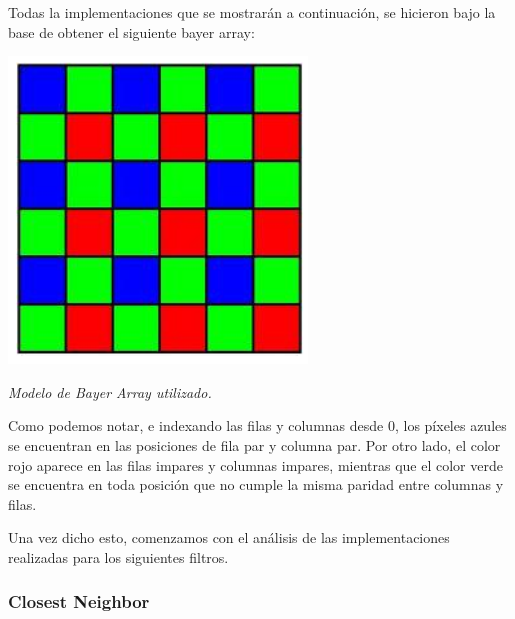 Todas la implementaciones que se mostrarán a continuación, se hicieron bajo la base de obtener el siguiente bayer array:

	\par 
	\begin{center}
		\includegraphics[scale=0.4]{./img/bayerarray.png}
		\par 
		\footnotesize\textit{Modelo de Bayer Array utilizado.}
	\end{center}
	\par 
	
Como podemos notar, e indexando las filas y columnas desde 0, los píxeles azules se encuentran en las posiciones de fila par y columna par. Por otro lado, el color rojo aparece en las filas impares y columnas impares, mientras que el color verde se encuentra en toda posición que no cumple la misma paridad entre columnas y filas.
\par 
Una vez dicho esto, comenzamos con el análisis de las implementaciones realizadas para los siguientes filtros.
	
\subsubsection{Closest Neighbor}


